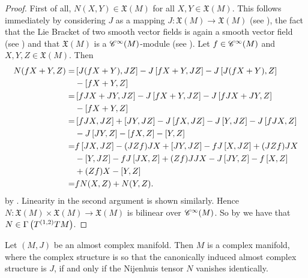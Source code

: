 \begin{proof}
First of all, $N(X,Y) \in \mathfrak{X}(M)$ for all $X,Y \in \mathfrak{X}(M)$. This follows immediately by considering $J$ as a mapping $J : \mathfrak{X}(M) \to \mathfrak{X}(M)$ (see \cite[26]{kobayashi:diff_geo_I:1996}), the fact that the Lie Bracket of two smooth vector fields is again a smooth vector field (see \cite[186]{lee:smooth_manifolds:2013}) and that $\mathfrak{X}(M)$ is a $\mathscr{C}^\infty(M)$-module (see \cite[177]{lee:smooth_manifolds:2013}). Let $f \in \mathscr{C}^\infty(M)$ and $X,Y,Z \in \mathfrak{X}(M)$. Then
\begin{align*}
N(fX + Y,Z) =& \sbr[0]{J(fX + Y),JZ} - J\sbr[0]{fX + Y,JZ} - J\sbr[0]{J(fX + Y),Z}\\
 &- \sbr[0]{fX + Y,Z}\\
=& \sbr[0]{fJX + JY,JZ} - J\sbr[0]{fX + Y,JZ} - J\sbr[0]{fJX + JY,Z}\\
& - \sbr[0]{fX + Y,Z}\\
=& \sbr[0]{fJX,JZ} + \sbr[0]{JY,JZ} - J\sbr[0]{fX,JZ} - J\sbr[0]{Y,JZ} - J\sbr[0]{fJX,Z}\\
& -J\sbr[0]{JY,Z} - \sbr[0]{fX,Z} - \sbr[0]{Y,Z}\\
=& f\sbr[0]{JX,JZ} - (JZf)JX + \sbr[0]{JY,JZ} - fJ\sbr[0]{X,JZ} + (JZf)JX\\
& - \sbr[0]{Y,JZ} - fJ\sbr[0]{JX,Z} + (Zf)JJX - J\sbr[0]{JY,Z} - f\sbr[0]{X,Z}\\
& + (Zf)X - \sbr[0]{Y,Z}\\
=& fN(X,Z) + N(Y,Z).
\end{align*}
\noindent by \cite[187--188]{lee:smooth_manifolds:2013}. Linearity in the second argument is shown similarly. Hence $N : \mathfrak{X}(M) \times \mathfrak{X}(M) \to \mathfrak{X}(M)$ is bilinear over $\mathscr{C}^\infty(M)$. So by \cite[26]{kobayashi:diff_geo_I:1996} we have that $N \in \Gamma\del[1]{T^{(1,2)}TM}$.
\end{proof}

\begin{theorem}
Let $(M,J)$ be an almost complex manifold. Then $M$ is a complex manifold, where the complex structure is so that the canonically induced almost complex structure is $J$, if and only if the Nijenhuis tensor $N$ vanishes identically.
\end{theorem}

